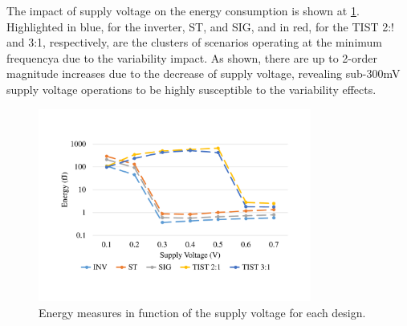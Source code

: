 \documentclass[pgmicro,diss,english]{iiufrgs}
\begin{document}
The impact of supply voltage on the energy consumption is shown at \ref{fig:energySupplyStep}. Highlighted in blue, for the inverter, ST, and SIG, and in red, for the TIST 2:! and 3:1, respectively, are the clusters of scenarios operating at the minimum frequencya due to the variability impact. As shown, there are up to 2-order magnitude increases due to the decrease of supply voltage, revealing sub-300mV supply voltage operations to be highly susceptible to the variability effects.


\begin{figure}[h]
	\centering
		\includegraphics[width=0.8\textwidth, trim={2cm 3cm 2cm 3cm}, clip]{energyIncreaseSupply.pdf}
		\caption{Energy measures in function of the supply voltage for each design.}
	\label{fig:energySupplyStep}
\end{figure}

\end{document}
